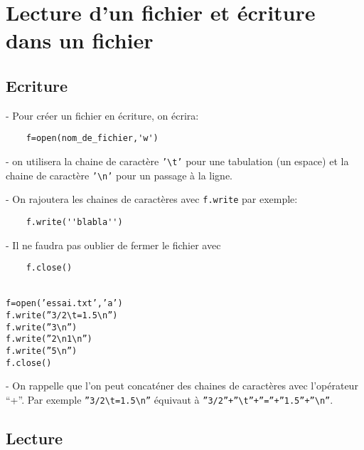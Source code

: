 \def\t{\textbackslash t}
\def\n{\textbackslash n}

\section*{Lecture d'un fichier et écriture dans un fichier}
	
\subsection*{Ecriture}

 - Pour créer un fichier en écriture, on écrira:

\begin{lstlisting}
	f=open(nom_de_fichier,'w')
\end{lstlisting}

- on utilisera la chaine de caractère \texttt{'\t'} pour une tabulation (un espace) et la chaine de caractère \texttt{'\n'} pour un passage à la ligne.

- On rajoutera les chaines de caractères avec \texttt{f.write} par exemple:

\begin{lstlisting}
	f.write(''blabla'')
\end{lstlisting}

- Il ne faudra pas oublier de fermer le fichier avec 

\begin{lstlisting}
	f.close()
\end{lstlisting}


\begin{exemple}
	\ \\[1mm]
	\texttt{f=open('essai.txt','a')}	\\
	\texttt{f.write(''3/2\t=1.5\n'')}\\
	\texttt{f.write(''3\n'')}\\
	\texttt{f.write(''2\n1\n'')}\\
	\texttt{f.write(''5\n'')}\\
	\texttt{f.close()}
\end{exemple}

- On rappelle que l'on peut concaténer des chaines de caractères avec l'opérateur “+”. Par exemple \texttt{''3/2\t=1.5\n''} équivaut à \texttt{''3/2''+''\t''+''=''+''1.5''+''\n''}.


\subsection*{Lecture}

